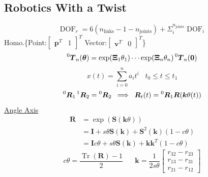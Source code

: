 \documentclass[twocolumn]{article}    %
\begin{document}
\pagestyle{empty}
\footnotesize 
\RaggedRight

\subsection*{Robotics With a Twist}
\begin{equation*}
    \operatorname{DOF}_r = 6(n_{\text{links}} - 1 - n_{\text{joints}}) + \Sigma_{i}^{n_{\text{joints}}} \operatorname{DOF}_i
\end{equation*}
Homo.\{Point:\(\begin{bmatrix} \bm{p}^T & 1 \end{bmatrix}^T\) Vector:\(\begin{bmatrix} \bm{v}^T & 0\end{bmatrix}^T\)\}\\
\begin{equation*}
    \prescript{0}{}{\bm{T}}_n(\bm{\theta}) = \operatorname{exp}(\bm{\Xi}_1\theta_1) \cdots \operatorname{exp}(\bm{\Xi}_n\theta_n) \prescript{0}{}{\bm{T}}_n(\bm{0})
\end{equation*}
\begin{equation*}
    x(t) = \sum_{i=0}^n a_it^i \hspace{10pt} t_0 \leq t\leq t_1
\end{equation*}
\begin{equation*}
    \prescript{0}{}{\bm{R}}_1 \prescript{1}{}{\bm{R}}_2 = \prescript{0}{}{\bm{R}}_2 \hspace{2.5pt} \implies \hspace{2.5pt} \bm{R}_t(t) = \prescript{0}{}{\bm{R}}_1\bm{R}(\bm{k}\theta(t))
\end{equation*}
\noindent\underline{Angle Axis}
\begin{align*}
    \bm{R} &=\operatorname{exp}(\bm{S}(\bm{k}\theta))\\
    &= \bm{I} + s\theta \bm{S}(\bm{k}) + \bm{S}^2(\bm{k})(1-c\theta) \\
    &= \bm{I}c\theta + s\theta\bm{S}(\bm{k}) + \bm{kk}^T(1-c\theta)
\end{align*}
\begin{equation*}
    c\theta = \frac{\operatorname{Tr} \left(\bm{R} \right)-1}{2} \hspace{20pt}     \bm{k} = \frac{1}{2s\theta} \begin{bmatrix}
        r_{32} -r_{23}\\
        r_{13} -r_{31}\\
        r_{21} -r_{12}
    \end{bmatrix}
\end{equation*}
\end{document}
